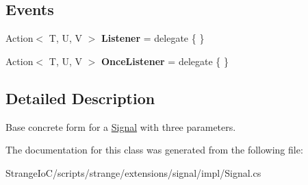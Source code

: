 \subsection*{Events}
\begin{DoxyCompactItemize}
\item 
\hypertarget{classstrange_1_1extensions_1_1signal_1_1impl_1_1_signal_3_01_t_00_01_u_00_01_v_01_4_ade2bdf64207354c820edc7aec8a3ef66}{Action$<$ T, U, V $>$ {\bfseries Listener} = delegate \{ \}}\label{classstrange_1_1extensions_1_1signal_1_1impl_1_1_signal_3_01_t_00_01_u_00_01_v_01_4_ade2bdf64207354c820edc7aec8a3ef66}

\item 
\hypertarget{classstrange_1_1extensions_1_1signal_1_1impl_1_1_signal_3_01_t_00_01_u_00_01_v_01_4_af5e074a5a0f490ce38801467e813d62e}{Action$<$ T, U, V $>$ {\bfseries Once\-Listener} = delegate \{ \}}\label{classstrange_1_1extensions_1_1signal_1_1impl_1_1_signal_3_01_t_00_01_u_00_01_v_01_4_af5e074a5a0f490ce38801467e813d62e}

\end{DoxyCompactItemize}


\subsection{Detailed Description}
Base concrete form for a \hyperlink{classstrange_1_1extensions_1_1signal_1_1impl_1_1_signal}{Signal} with three parameters. 

The documentation for this class was generated from the following file\-:\begin{DoxyCompactItemize}
\item 
Strange\-Io\-C/scripts/strange/extensions/signal/impl/Signal.\-cs\end{DoxyCompactItemize}
